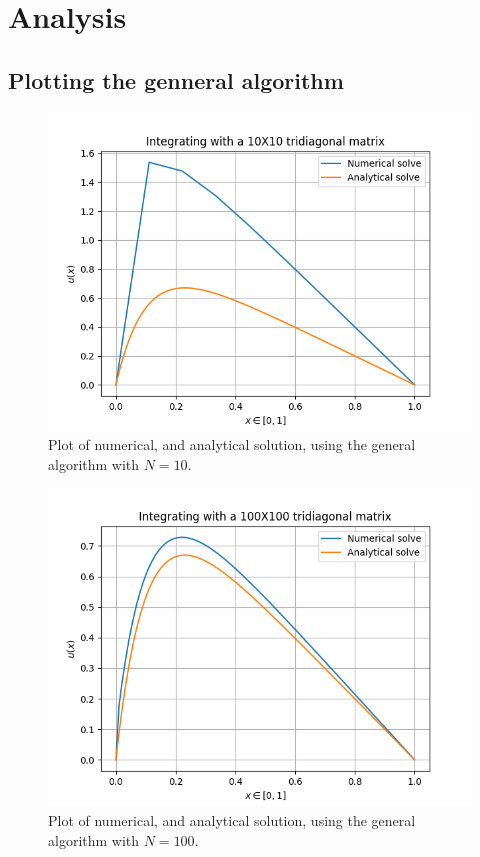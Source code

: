 \documentclass[english,notitlepage,reprint]{revtex4-1}  %
\begin{document}
\section{Analysis}\label{sec:4}

\subsection{Plotting the genneral algorithm}\label{subsec:41}
\begin{figure}[H]
	\centering
	\label{fig:411}
	\includegraphics[width=\columnwidth]{../figures/NumVsAnal10x10.png}
	\caption{Plot of numerical, and analytical solution, using the general algorithm with
	\(N=10\).}
\end{figure}

\begin{figure}[H]
	\centering
	\label{fig:412}
	\includegraphics[width=\columnwidth]{../figures/NumVsAnal100x100.png}
	\caption{Plot of numerical, and analytical solution, using the general algorithm with
	\(N=100\).}
\end{figure}
\end{document}
